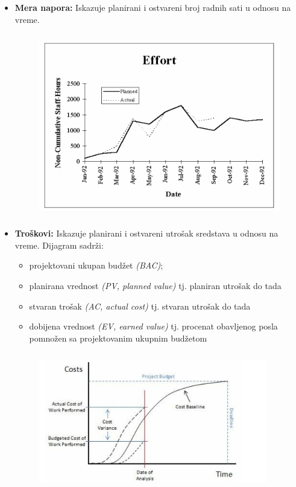 \documentclass[a4paper]{article}
\begin{document}
\begin{itemize}
\begin{figure}[H]
\begin{center}
      \end{center}
    \end{figure}
    \item \textbf{Mera napora:} Iskazuje planirani i ostvareni broj radnih sati u odnosu na vreme.
    \begin{figure}[H]
      \begin{center}
          \includegraphics[width=120mm,height=80mm]{Slike/mera_napora.png}
      \end{center}
    \end{figure}
    \item \textbf{Troškovi:} Iskazuje planirani i ostvareni utrošak sredstava u odnosu na vreme. 
          Dijagram sadrži:
    \begin{itemize}
      \item projektovani ukupan budžet \textit{(BAC)};
      \item planirana vrednost \textit{(PV, planned value)} tj. planiran utrošak do tada
      \item stvaran trošak \textit{(AC, actual cost)} tj. stvaran utrošak do tada
      \item dobijena vrednost \textit{(EV, earned value)} tj. procenat obavljenog posla 
            pomnožen sa projektovanim ukupnim budžetom
    \end{itemize}
    \begin{figure}[H]
      \begin{center}
          \includegraphics[width=100mm,height=60mm]{Slike/trosak.png}

\end{center}
\end{figure}
\end{itemize}
\end{document}
